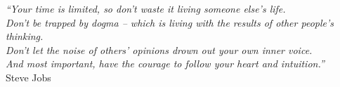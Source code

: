 \cleardoublepage
\thispagestyle{plain}

\vspace*{8cm}



\begin{flushright}
   \textsl{``Your time is limited, so don't waste it living someone else's life.\\
   	Don't be trapped by dogma -- which is living with the results of other people's thinking.\\
   	Don't let the noise of others' opinions drown out your own inner voice.\\
   	And most important, have the courage to follow your heart and intuition.''} \\
\vspace*{1.5cm}
           Steve Jobs
\end{flushright}




